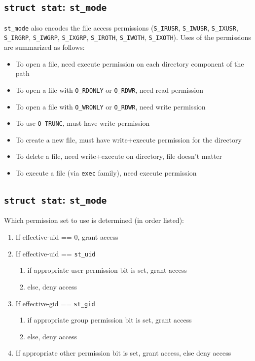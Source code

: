 \documentclass[xga]{xdvislides}
\begin{document}
\subsection{{\tt struct stat}: {\tt st\_mode}}
{\tt st\_mode} also encodes the file access permissions ({\tt S\_IRUSR},
{\tt S\_IWUSR}, {\tt S\_IXUSR}, {\tt S\_IRGRP}, {\tt S\_IWGRP}, {\tt S\_IXGRP},
{\tt S\_IROTH}, {\tt S\_IWOTH}, {\tt S\_IXOTH}).  Uses of the permissions are
summarized as follows:

\begin{itemize}
	\item To open a file, need execute permission on each directory component of the path
	\item To open a file with {\tt O\_RDONLY} or {\tt O\_RDWR}, need read permission
	\item To open a file with {\tt O\_WRONLY} or {\tt O\_RDWR}, need write permission
	\item To use {\tt O\_TRUNC}, must have write permission
	\item To create a new file, must have write+execute permission for the directory
	\item To delete a file, need write+execute on directory, file doesn't matter
	\item To execute a file (via {\tt exec} family), need execute permission
\end{itemize}

\subsection{{\tt struct stat}: {\tt st\_mode}}
Which permission set to use is determined (in order listed):
\begin{enumerate}
	\item If effective-uid == 0, grant access
	\item If effective-uid == {\tt st\_uid}
		\begin{enumerate}
			\item if appropriate user permission bit is set, grant access
			\item else, deny access
		\end{enumerate}
	\item If effective-gid == {\tt st\_gid}
		\begin{enumerate}
			\item if appropriate group permission bit is set, grant access
			\item else, deny access
		\end{enumerate}
	\item If appropriate other permission bit is set, grant access, else deny access
\end{enumerate}
\end{document}
